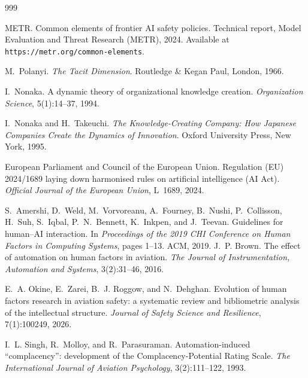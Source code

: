 \begin{thebibliography}{999}

METR.
Common elements of frontier AI safety policies.
Technical report, Model Evaluation and Threat Research (METR), 2024.
Available at \texttt{https://metr.org/common-elements}.

M.~Polanyi.
\newblock \emph{The Tacit Dimension}.
\newblock Routledge \& Kegan Paul, London, 1966.

I.~Nonaka.
\newblock A dynamic theory of organizational knowledge creation.
\newblock \emph{Organization Science}, 5(1):14--37, 1994.

I.~Nonaka and H.~Takeuchi.
\newblock \emph{The Knowledge-Creating Company: How Japanese Companies Create the Dynamics of Innovation}.
\newblock Oxford University Press, New York, 1995.

European Parliament and Council of the European Union.
\newblock Regulation (EU) 2024/1689 laying down harmonised rules on artificial intelligence (AI Act).
\newblock \emph{Official Journal of the European Union}, L~1689, 2024.

S.~Amershi, D.~Weld, M.~Vorvoreanu, A.~Fourney, B.~Nushi, P.~Collisson, H.~Suh,
S.~Iqbal, P.~N.~Bennett, K.~Inkpen, and J.~Teevan.
\newblock Guidelines for human--AI interaction.
\newblock In \emph{Proceedings of the 2019 CHI Conference on Human Factors in Computing Systems}, pages 1--13.
\newblock ACM, 2019.
J.~P. Brown.
\newblock The effect of automation on human factors in aviation.
\newblock \emph{The Journal of Instrumentation, Automation and Systems}, 3(2):31--46, 2016.

E.~A. Okine, E.~Zarei, B.~J. Roggow, and N.~Dehghan.
\newblock Evolution of human factors research in aviation safety: a systematic review and bibliometric analysis of the intellectual structure.
\newblock \emph{Journal of Safety Science and Resilience}, 7(1):100249, 2026.

I.~L. Singh, R.~Molloy, and R.~Parasuraman.
\newblock Automation-induced ``complacency'': development of the Complacency-Potential Rating Scale.
\newblock \emph{The International Journal of Aviation Psychology}, 3(2):111--122, 1993.


\end{thebibliography}
